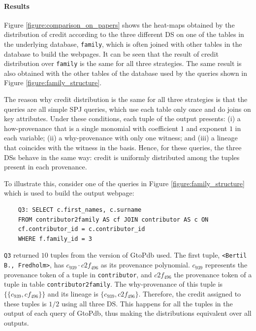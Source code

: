 \paragraph{Results} Figure \ref{figure:comparison_on_papers} shows the heat-maps obtained by the distribution of credit according to the three different DS on one of the tables in the underlying database, \texttt{family},
which is often joined with other tables in the database to build the webpages.
It can be seen that the result of  credit distribution over \texttt{family} is the same for all three strategies. The same result is also obtained with the other tables of the database used by the queries shown in Figure \ref{figure:family_structure}. 

The reason why credit distribution is the same for all three strategies is that the queries are all simple SPJ queries, which use each table only once and do joins on key attributes. 
Under these conditions, each tuple of the output presents: (i) a how-provenance that is a single monomial with coefficient $1$ and exponent $1$ in each variable; (ii) a why-provenance with only one witness; and (iii) a lineage that coincides with the witness in the basis.
Hence, for these queries, the three DSs behave in the same way: credit is uniformly distributed among the tuples present in each provenance. 

To illustrate this, consider one of the queries in Figure \ref{figure:family_structure} which is used to build the output webpage:

\vspace{2mm}
{\footnotesize
\begin{adjustwidth}{25pt}{5pt}
	\begin{verbatim}
	Q3: SELECT c.first_names, c.surname
	FROM contributor2family AS cf JOIN contributor AS c ON 
	cf.contributor_id = c.contributor_id 
	WHERE f.family_id = 3
\end{verbatim}
\end{adjustwidth}
}
\vspace{2mm}

\texttt{Q3} returned $10$ tuples from the version of GtoPdb used. 
The first tuple, \texttt{<Bertil B., Fredholm>}, has  $c_{939} \cdot c2f_{496}$ as its provenance polynomial.
$c_{939}$ represents the provenance token of a tuple in \texttt{contributor}, and $c2f_{496}$ the provenance token of a tuple in table \texttt{contributor2family}. 
The why-provenance of this tuple is $\{\{c_{939}, cf_{496} \}\}$ and its lineage is $\{c_{939}, c2f_{496} \}$.
Therefore, the credit assigned to these tuples is $1/2$ using all three DS.
This happens for all the tuples in the output of each query of GtoPdb, thus making the distributions equivalent over all outputs.

